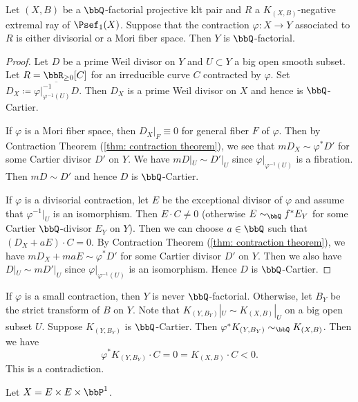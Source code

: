     \begin{proposition}\label{prop:divisorial_or_fibered_contraction_preverses_Q_factorial}
        Let \((X,B)\) be a \(\bbQ\)-factorial projective klt pair and \(R\) a \(K_{(X,B)}\)-negative extremal ray of \(\Psef_1(X)\).
        Suppose that the contraction \(\varphi:X\to Y\) associated to \(R\) is either divisorial or a Mori fiber space. 
        Then \(Y\) is \(\bbQ\)-factorial.
    \end{proposition}
    \begin{proof}
        Let \(D\) be a prime Weil divisor on \(Y\) and \(U \subset Y\) a big open smooth subset.
        Let \(R = \bbR_{\geq 0}[C]\) for an irreducible curve \(C\) contracted by \(\varphi\).
        Set \(D_X \coloneqq \overline{\varphi|_{\varphi^{-1}(U)}^{-1} D}\).
        Then \(D_X\) is a prime Weil divisor on \(X\) and hence is \(\bbQ\)-Cartier.

        If \(\varphi\) is a Mori fiber space, then \(D_X|_F \equiv 0\) for general fiber \(F\) of \(\varphi\).
        Then by Contraction Theorem (\cref{thm: contraction theorem}), we see that \(mD_X \sim \varphi^* D'\) for some Cartier divisor \(D'\) on \(Y\).
        We have \(mD|_{U} \sim D'|_{U}\) since \(\varphi|_{\varphi^{-1}(U)}\) is a fibration.
        Then \(mD \sim D'\) and hence \(D\) is \(\bbQ\)-Cartier.

        If \(\varphi\) is a divisorial contraction, let \(E\) be the exceptional divisor of \(\varphi\) and assume that \(\varphi^{-1}|_U\) is an isomorphism.
        Then \(E \cdot C \neq 0\) (otherwise \(E \sim_{\bbQ} f^*E_Y\) for some Cartier \(\bbQ\)-divisor \(E_Y\) on \(Y\)).
        Then we can choose \(a\in\bbQ\) such that \((D_X + aE)\cdot C = 0\).
        By Contraction Theorem (\cref{thm: contraction theorem}), we have \(mD_X + maE \sim \varphi^* D'\) for some Cartier divisor \(D'\) on \(Y\).
        Then we also have \(D|_{U} \sim mD'|_{U}\) since \(\varphi|_{\varphi^{-1}(U)}\) is an isomorphism.
        Hence \(D\) is \(\bbQ\)-Cartier.
    \end{proof}
    \begin{remark}\label{rmk:small_contraction_is_never_Q_factorial}
        If \(\varphi\) is a small contraction, then \(Y\) is never \(\bbQ\)-factorial.
        Otherwise, let \(B_Y\) be the strict transform of \(B\) on \(Y\).
        Note that \(K_{(Y,B_Y)}|_U \sim K_{(X,B)}|_U\) on a big open subset \(U\).
        Suppose \(K_{(Y,B_Y)}\) is \(\bbQ\)-Cartier.
        Then \(\varphi^*K_{(Y,B_Y)} \sim_\bbQ K_{(X,B)}\).
        Then we have
        \[ \varphi^*K_{(Y,B_Y)}\cdot C = 0 = K_{(X,B)}\cdot C < 0. \]
        This is a contradiction.
    \end{remark}

    \begin{example}
        Let \(X = E\times E \times \bbP^1\).
    \end{example}

    